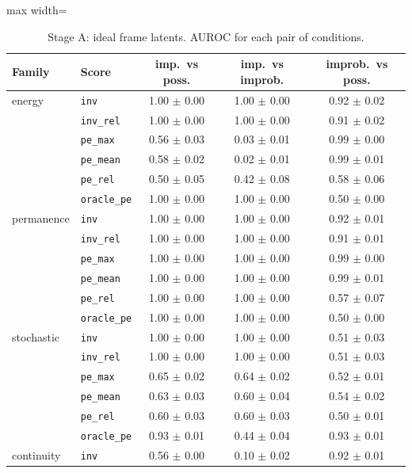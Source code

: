 \begin{table}[t]\centering\small
\caption{Stage A: ideal frame latents. AUROC for each pair of conditions.}\label{tab:stageA}
\begin{adjustbox}{max width=\linewidth}\begin{tabular}{llccc}\toprule
Family & Score & imp.\ vs poss. & imp.\ vs improb. & improb.\ vs poss.\\\midrule
energy & \texttt{inv} & 1.00 $\pm$ 0.00 & 1.00 $\pm$ 0.00 & 0.92 $\pm$ 0.02\\
 & \texttt{inv\_rel} & 1.00 $\pm$ 0.00 & 1.00 $\pm$ 0.00 & 0.91 $\pm$ 0.02\\
 & \texttt{pe\_max} & 0.56 $\pm$ 0.03 & 0.03 $\pm$ 0.01 & 0.99 $\pm$ 0.00\\
 & \texttt{pe\_mean} & 0.58 $\pm$ 0.02 & 0.02 $\pm$ 0.01 & 0.99 $\pm$ 0.01\\
 & \texttt{pe\_rel} & 0.50 $\pm$ 0.05 & 0.42 $\pm$ 0.08 & 0.58 $\pm$ 0.06\\
 & \texttt{oracle\_pe} & 1.00 $\pm$ 0.00 & 1.00 $\pm$ 0.00 & 0.50 $\pm$ 0.00\\
\midrule
permanence & \texttt{inv} & 1.00 $\pm$ 0.00 & 1.00 $\pm$ 0.00 & 0.92 $\pm$ 0.01\\
 & \texttt{inv\_rel} & 1.00 $\pm$ 0.00 & 1.00 $\pm$ 0.00 & 0.91 $\pm$ 0.01\\
 & \texttt{pe\_max} & 1.00 $\pm$ 0.00 & 1.00 $\pm$ 0.00 & 0.99 $\pm$ 0.00\\
 & \texttt{pe\_mean} & 1.00 $\pm$ 0.00 & 1.00 $\pm$ 0.00 & 0.99 $\pm$ 0.01\\
 & \texttt{pe\_rel} & 1.00 $\pm$ 0.00 & 1.00 $\pm$ 0.00 & 0.57 $\pm$ 0.07\\
 & \texttt{oracle\_pe} & 1.00 $\pm$ 0.00 & 1.00 $\pm$ 0.00 & 0.50 $\pm$ 0.00\\
\midrule
stochastic & \texttt{inv} & 1.00 $\pm$ 0.00 & 1.00 $\pm$ 0.00 & 0.51 $\pm$ 0.03\\
 & \texttt{inv\_rel} & 1.00 $\pm$ 0.00 & 1.00 $\pm$ 0.00 & 0.51 $\pm$ 0.03\\
 & \texttt{pe\_max} & 0.65 $\pm$ 0.02 & 0.64 $\pm$ 0.02 & 0.52 $\pm$ 0.01\\
 & \texttt{pe\_mean} & 0.63 $\pm$ 0.03 & 0.60 $\pm$ 0.04 & 0.54 $\pm$ 0.02\\
 & \texttt{pe\_rel} & 0.60 $\pm$ 0.03 & 0.60 $\pm$ 0.03 & 0.50 $\pm$ 0.01\\
 & \texttt{oracle\_pe} & 0.93 $\pm$ 0.01 & 0.44 $\pm$ 0.04 & 0.93 $\pm$ 0.01\\
\midrule
continuity & \texttt{inv} & 0.56 $\pm$ 0.00 & 0.10 $\pm$ 0.02 & 0.92 $\pm$ 0.01\\

\end{tabular}
\end{adjustbox}
\end{table}
